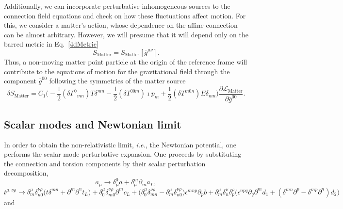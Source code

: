 \documentclass[twocolumn,aps,
  showpacs,showkeys,prd,superscriptaddress]{revtex4-1}
\renewcommand{\(}{\left(}
\renewcommand{\)}{\right)}
\renewcommand{\[}{\left[}
\renewcommand{\]}{\right]}
\begin{document}
Additionally, we can incorporate perturbative inhomogeneous sources to the connection field equations and check on how these fluctuations affect motion. For this, we consider a matter's action, whose dependence on the affine connection can be almost arbitrary. However, we will presume that it will depend only on the barred metric in Eq.~\eqref{4dMetric}
$$ S_{\text{Matter}} = {S}_{\text{Matter}}[\bar{g}^{\mu\nu}].$$
Thus, a non-moving matter point particle at the origin of the reference frame will contribute to the equations of motion for the gravitational field through the component $\bar{g}^{00}$ following the symmetries of the matter source 
\begin{dmath}
  \label{mattervariation}
  \delta {S}_{\text{Matter}} =  C_1 \Big(- \frac{1}{2} ({\delta\Gamma}^{0}{}_{m n})  T {\delta}^{m n} - \frac{1}{2}  ({\delta T}^{0 0 m})  \imath {p}_{m} + \frac{1}{2}  ({\delta T}^{m 0 n})  E {\delta}_{m n} \Big)\frac{\partial\mathcal{L}_{\text{Matter}}}{\partial \bar{g}^{00}}.
\end{dmath}


\subsection*{Scalar modes  and Newtonian limit}

In order to obtain the non-relativistic limit, \emph{i.e.}, the Newtonian potential, one performs the scalar mode perturbative expansion. One proceeds by substituting the connection and torsion components by their scalar perturbation decomposition,
\begin{equation}
  a_\mu \to \delta_\mu^0 a+\delta_\mu^m \partial_{m}a_L,
\end{equation}
\mbox{}
\begin{dmath}
  t^{\mu,\nu\rho} \to \delta^{\mu}_m\delta^{\nu\rho}_{n0} \Big(t \delta^{m n} + \partial^m \partial^n t_L \Big)
  +\delta^{\mu}_0 \delta^{\nu\rho}_{m0} \partial^m c_L
  + \Big(\delta^{\mu}_0\delta^{\nu\rho}_{mn}-\delta^{\mu}_m\delta^{\nu\rho}_{n0}\Big)\epsilon^{m n p} \partial_{p} b
  +\delta^{\mu}_m \delta^{\nu}_{n} \delta^{\rho}_{p} \Big(\epsilon^{n p q}\partial_q \partial^m d_1 +  (\delta^{m n} \partial^p - \delta^{m p} \partial^n)d_2\Big)
\end{dmath}
and
\end{document}
